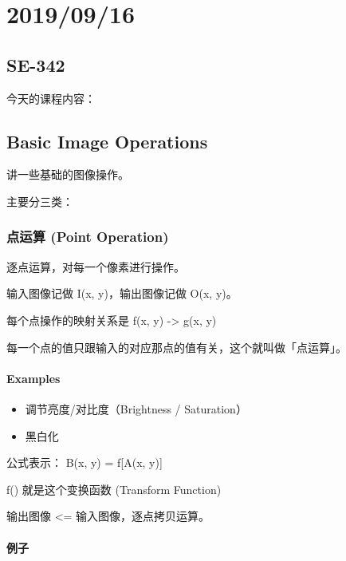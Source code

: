 \documentclass[
]{article}
\date{}
\begin{document}
\hypertarget{header-n0}{%
\section{2019/09/16}\label{header-n0}}

\hypertarget{header-n2}{%
\subsection{SE-342}\label{header-n2}}

今天的课程内容：

\hypertarget{header-n4}{%
\subsection{Basic Image Operations}\label{header-n4}}

讲一些基础的图像操作。

主要分三类：

\hypertarget{header-n7}{%
\subsubsection{点运算 (Point Operation)}\label{header-n7}}

逐点运算，对每一个像素进行操作。

输入图像记做 I(x, y)，输出图像记做 O(x, y)。

每个点操作的映射关系是 f(x, y) -\textgreater{} g(x, y)

每一个点的值只跟输入的对应那点的值有关，这个就叫做「点运算」。

\hypertarget{header-n12}{%
\paragraph{Examples}\label{header-n12}}

\begin{itemize}
\item
  调节亮度/对比度（Brightness / Saturation）
\item
  黑白化
\end{itemize}

公式表示： B(x, y) = f{[}A(x, y){]}

f() 就是这个变换函数 (Transform Function)

输出图像 \textless= 输入图像，逐点拷贝运算。

\hypertarget{header-n21}{%
\paragraph{例子}\label{header-n21}}
\end{document}
